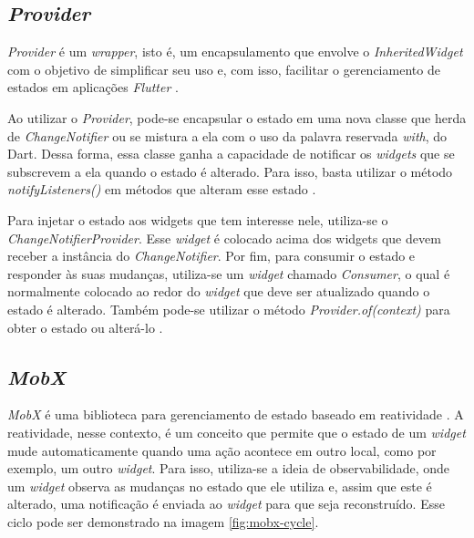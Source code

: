 \subsection{\textit{Provider}}
\label{cap2:Subsec:Provider}

\textit{Provider} é um \textit{wrapper}, isto é, um encapsulamento que envolve o \textit{InheritedWidget} com o objetivo de simplificar seu uso e, com isso, facilitar o gerenciamento de estados em aplicações \textit{Flutter} \cite{provider-package}.

Ao utilizar o \textit{Provider}, pode-se encapsular o estado em uma nova classe que herda de \textit{ChangeNotifier} ou se mistura a ela com o uso da palavra reservada \textit{with}, do Dart. Dessa forma, essa classe ganha a capacidade de notificar os \textit{widgets} que se subscrevem a ela quando o estado é alterado. Para isso, basta utilizar o método \textit{notifyListeners()} em métodos que alteram esse estado \cite{flutter2022simple} \cite{flutter2019statemgmt}.

Para injetar o estado aos widgets que tem interesse nele, utiliza-se o \textit{ChangeNotifierProvider}. Esse \textit{widget} é colocado acima dos widgets que devem receber a instância do \textit{ChangeNotifier}. Por fim, para consumir o estado e responder às suas mudanças, utiliza-se um \textit{widget} chamado \textit{Consumer}, o qual é normalmente colocado ao redor do \textit{widget} que deve ser atualizado quando o estado é alterado. Também pode-se utilizar o método \textit{Provider.of(context)} para obter o estado ou alterá-lo \cite{flutter2022simple} \cite{flutter2019statemgmt}.

\subsection{\textit{MobX}}
\label{cap2:Subsec:MobX}
\textit{MobX} é uma biblioteca para gerenciamento de estado baseado em reatividade \cite{mobx-package}. A reatividade, nesse contexto, é um conceito que permite que o estado de um \textit{widget} mude automaticamente quando uma ação acontece em outro local, como por exemplo, um outro \textit{widget}. Para isso, utiliza-se a ideia de observabilidade, onde um \textit{widget} observa as mudanças no estado que ele utiliza e, assim que este é alterado, uma notificação é enviada ao \textit{widget} para que seja reconstruído. Esse ciclo pode ser demonstrado na imagem \ref{fig:mobx-cycle}.

